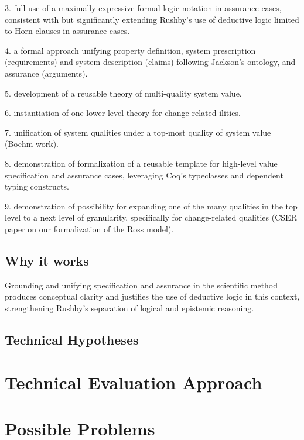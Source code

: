 \documentclass{article} %
\begin{document}
3. full use of a maximally expressive formal logic notation in assurance cases, consistent with but significantly extending Rushby's use of deductive logic limited to Horn clauses in assurance cases.

4. a formal approach unifying property definition, system prescription (requirements)  and system description (claims) following Jackson's ontology, and assurance (arguments).

5. development of a reusable theory of multi-quality system value.

6. instantiation of one lower-level theory for change-related ilities.

7. unification of system qualities under a top-most quality of system value (Boehm work).

8. demonstration of formalization of a reusable template for high-level value specification and assurance cases, leveraging Coq's typeclasses and dependent typing constructs.

9. demonstration of possibility for expanding one of the many qualities in the top level to a next level of granularity, specifically for change-related qualities (CSER paper on our formalization of the Ross model).

\subsection{Why it works}

Grounding and unifying specification and assurance in the scientific method produces conceptual clarity and justifies the use of deductive logic in this context, strengthening Rushby's separation of logical and epistemic reasoning.
\subsection{Technical Hypotheses}

\section{Technical Evaluation Approach}

\section{Possible Problems}
\end{document}
